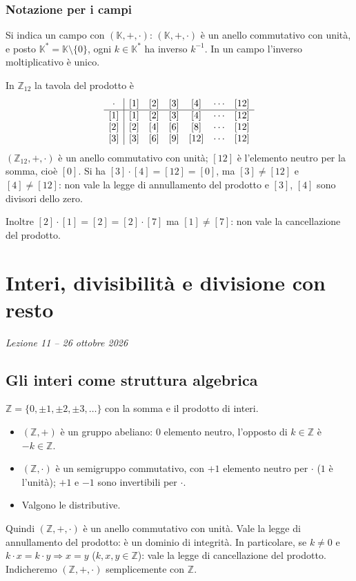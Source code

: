 \documentclass[11pt,a4paper]{article}
\begin{document}
\subsubsection{Notazione per i campi}

Si indica un campo con $(\mathbb{K}, +, \cdot)$: $(\mathbb{K}, +, \cdot)$ è un anello commutativo con unità, e posto $\mathbb{K}^* = \mathbb{K}\setminus\{0\}$, ogni $k \in \mathbb{K}^*$ ha inverso $k^{-1}$. In un campo l'inverso moltiplicativo è unico.

\begin{esempio}
In $\mathbb{Z}_{12}$ la tavola del prodotto è
\[
\begin{array}{c|cccccc}
  \cdot & [1] & [2] & [3] & [4] & \cdots & [12] \\ \hline
  \relax[1] & [1] & [2] & [3] & [4] & \cdots & [12] \\
  \relax[2] & [2] & [4] & [6] & [8] & \cdots & [12] \\
  \relax[3] & [3] & [6] & [9] & [12] & \cdots & [12]
\end{array}
\]
$(\mathbb{Z}_{12}, +, \cdot)$ è un anello commutativo con unità; $[12]$ è l'elemento neutro per la somma, cioè $[0]$. Si ha $[3]\cdot[4] = [12] = [0]$, ma $[3] \neq [12]$ e $[4] \neq [12]$: non vale la legge di annullamento del prodotto e $[3]$, $[4]$ sono divisori dello zero.

Inoltre $[2]\cdot[1] = [2] = [2]\cdot[7]$ ma $[1] \neq [7]$: non vale la cancellazione del prodotto.
\end{esempio}

\section[Interi, divisibilità e divisione con resto (Lezione 11 -- 26 ottobre 2026)]{Interi, divisibilità e divisione con resto}
\noindent\emph{Lezione 11 -- 26 ottobre 2026}
\subsection{Gli interi come struttura algebrica}

$\mathbb{Z} = \{0, \pm 1, \pm 2, \pm 3, \dots\}$ con la somma e il prodotto di interi.
\begin{itemize}
  \item $(\mathbb{Z}, +)$ è un gruppo abeliano: $0$ elemento neutro, l'opposto di $k \in \mathbb{Z}$ è $-k \in \mathbb{Z}$.
  \item $(\mathbb{Z}, \cdot)$ è un semigruppo commutativo, con $+1$ elemento neutro per $\cdot$ ($1$ è l'unità); $+1$ e $-1$ sono invertibili per $\cdot$.
  \item Valgono le distributive.
\end{itemize}
Quindi $(\mathbb{Z}, +, \cdot)$ è un anello commutativo con unità. Vale la legge di annullamento del prodotto: è un dominio di integrità. In particolare, se $k \neq 0$ e $k\cdot x = k\cdot y \Rightarrow x = y$ ($k, x, y \in \mathbb{Z}$): vale la legge di cancellazione del prodotto. Indicheremo $(\mathbb{Z}, +, \cdot)$ semplicemente con $\mathbb{Z}$.
\end{document}
